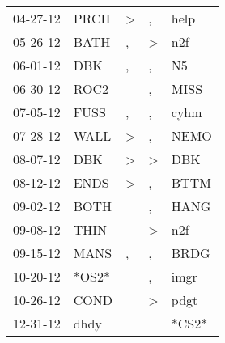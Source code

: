 \begin{supertabular}{p{0.07\textwidth}p{0.06\textwidth}p{0.02\textwidth}p{0.02\textwidth}p{0.06\textwidth}}
          04-27-12\textsuperscript{} &           PRCH\textsuperscript{} &     \textgreater &                , &           help\textsuperscript{} \\
          05-26-12\textsuperscript{} &           BATH\textsuperscript{} &                , &     \textgreater &            n2f\textsuperscript{} \\
          06-01-12\textsuperscript{} &            DBK\textsuperscript{} &                , &                , &             N5\textsuperscript{} \\
          06-30-12\textsuperscript{} &           ROC2\textsuperscript{} &                  &                , &           MISS\textsuperscript{} \\
          07-05-12\textsuperscript{} &           FUSS\textsuperscript{} &                , &                , &           cyhm\textsuperscript{} \\
          07-28-12\textsuperscript{} &           WALL\textsuperscript{} &     \textgreater &                , &           NEMO\textsuperscript{} \\
          08-07-12\textsuperscript{} &            DBK\textsuperscript{} &     \textgreater &     \textgreater &            DBK\textsuperscript{} \\
          08-12-12\textsuperscript{} &           ENDS\textsuperscript{} &     \textgreater &                , &           BTTM\textsuperscript{} \\
          09-02-12\textsuperscript{} &           BOTH\textsuperscript{} &                  &                , &           HANG\textsuperscript{} \\
          09-08-12\textsuperscript{} &           THIN\textsuperscript{} &                  &     \textgreater &            n2f\textsuperscript{} \\
          09-15-12\textsuperscript{} &           MANS\textsuperscript{} &                , &                , &           BRDG\textsuperscript{} \\
          10-20-12\textsuperscript{} &                            *OS2* &                  &                , &           imgr\textsuperscript{} \\
          10-26-12\textsuperscript{} &           COND\textsuperscript{} &                  &     \textgreater &           pdgt\textsuperscript{} \\
          12-31-12\textsuperscript{} &           dhdy\textsuperscript{} &                  &                  &                            *CS2* \\

\end{supertabular}
